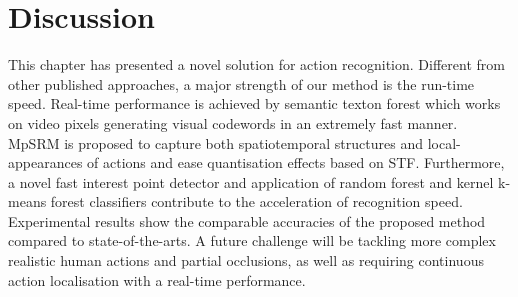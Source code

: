\section{Discussion}
\label{sec/act/discussion}
This chapter has presented a novel solution for action recognition. Different from other published approaches, a major strength of our method is the run-time speed. Real-time performance is achieved by semantic texton forest which works on video pixels generating visual codewords in an extremely fast manner. MpSRM is proposed to capture both spatiotemporal structures and local-appearances of actions and ease quantisation effects based on STF. Furthermore, a novel fast interest point detector and application of random forest and kernel k-means forest classifiers contribute to the acceleration of recognition speed. Experimental results show the comparable accuracies of the proposed method compared to state-of-the-arts. A future challenge will be tackling more complex realistic human actions and partial occlusions, as well as requiring continuous action localisation with a real-time performance.

